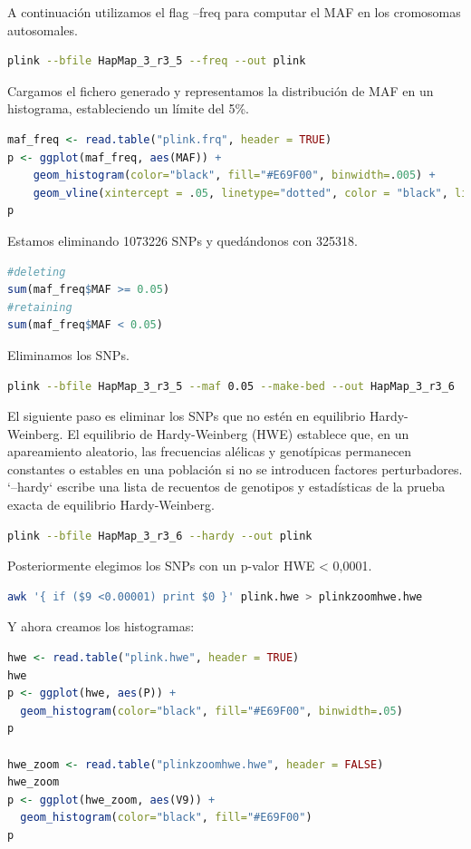 A continuación utilizamos el flag --freq para computar el MAF en los cromosomas autosomales.
\begin{lstlisting}[language=bash]
plink --bfile HapMap_3_r3_5 --freq --out plink
\end{lstlisting}

Cargamos el fichero generado y representamos la distribución de MAF en un histograma, estableciendo un límite del 5\%.
\begin{lstlisting}[language=R]
maf_freq <- read.table("plink.frq", header = TRUE)
p <- ggplot(maf_freq, aes(MAF)) +
	geom_histogram(color="black", fill="#E69F00", binwidth=.005) +
	geom_vline(xintercept = .05, linetype="dotted", color = "black", linewidth=.9)
p
\end{lstlisting}

Estamos eliminando 1073226 SNPs y quedándonos con 325318.
\begin{lstlisting}[language=R]
#deleting
sum(maf_freq$MAF >= 0.05)
#retaining
sum(maf_freq$MAF < 0.05)
\end{lstlisting}

Eliminamos los SNPs.
\begin{lstlisting}[language=bash]
plink --bfile HapMap_3_r3_5 --maf 0.05 --make-bed --out HapMap_3_r3_6
\end{lstlisting}

El siguiente paso es eliminar los SNPs que no estén en equilibrio Hardy-Weinberg. El equilibrio de Hardy-Weinberg (HWE) establece que, en un apareamiento aleatorio, las frecuencias alélicas y genotípicas permanecen constantes o estables en una población si no se introducen factores perturbadores. `--hardy` escribe una lista de recuentos de genotipos y estadísticas de la prueba exacta de equilibrio Hardy-Weinberg.
\begin{lstlisting}[language=bash]
plink --bfile HapMap_3_r3_6 --hardy --out plink
\end{lstlisting}

Posteriormente elegimos los SNPs con un p-valor HWE < 0,0001.
\begin{lstlisting}[language=bash]
awk '{ if ($9 <0.00001) print $0 }' plink.hwe > plinkzoomhwe.hwe
\end{lstlisting}

Y ahora creamos los histogramas:
\begin{lstlisting}[language=R]
hwe <- read.table("plink.hwe", header = TRUE)
hwe
p <- ggplot(hwe, aes(P)) +
  geom_histogram(color="black", fill="#E69F00", binwidth=.05)
p

hwe_zoom <- read.table("plinkzoomhwe.hwe", header = FALSE)
hwe_zoom
p <- ggplot(hwe_zoom, aes(V9)) +
  geom_histogram(color="black", fill="#E69F00")
p
\end{lstlisting}

